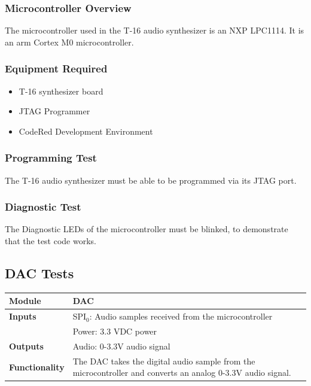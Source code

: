 \documentclass{article}
\begin{document}
\subsubsection{Microcontroller Overview}
The microcontroller used in the T-16 audio synthesizer is an NXP
LPC1114. It is an arm Cortex M0 microcontroller.

\subsubsection{Equipment Required}
\begin{itemize}
  \item T-16 synthesizer board
  \item JTAG Programmer
  \item CodeRed Development Environment 
\end{itemize}

\subsubsection{Programming Test} 
The T-16 audio synthesizer must be able to be programmed via its JTAG port. 

\subsubsection{Diagnostic Test}
The Diagnostic LEDs of the microcontroller must be blinked, to
demonstrate that the test code works.

\subsection{DAC Tests}

\begin{tabular}{|p{1in}|p{5in}|}
\hline
\textbf{Module} & DAC \\
\hline
\textbf{Inputs}& SPI$_0$: Audio samples received from the microcontroller\\
	     & Power: 3.3 VDC power\\
\hline
\textbf{Outputs}& Audio: 0-3.3V audio signal \\ 
\hline
\textbf{Functionality}& The DAC takes the digital audio sample from the microcontroller and converts an analog 0-3.3V audio signal.\\
\hline
\end{tabular}
\end{document}
